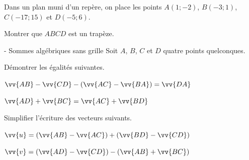 \documentclass[11pt,a4paper]{article}  %
\begin{document}

\begin{exercice}{}
	Dans un plan muni d'un repère, on place les points $A(1;-2)$, $B(-3;1)$, $C(-17;15)$ et $D(-5;6)$.
	
	Montrer que $ABCD$ est un trapèze.
\end{exercice}


\begin{exercice} { - Sommes alg\'ebriques sans grille}
	Soit $A$, $B$, $C$ et $D$ quatre points quelconques.
	\begin{enumMet} \item Démontrer les \'egalit\'es suivantes.
		\begin{enumMet}
			\item 
			$\vv{AB} - \vv{CD} - \left(\vv{AC} -\vv{BA}\right) = \vv{DA}$
			\item  $\vv{AD} + \vv{BC} = \vv{AC} + \vv{BD}$
		\end{enumMet}
		
		\item Simplifier l'écriture des vecteurs suivants.
		\begin{enumMet}
			\item $\vv{u} = \left( \vv{AB} -\vv{AC}\right) + \left(\vv{BD} - \vv{CD}\right)$
			\item $\vv{v} = \left(\vv{AD} -\vv{CD}\right) - \left(\vv{AB} + \vv{BC}\right)$
		\end{enumMet}
	\end{enumMet}
\end{exercice}
\end{document}
